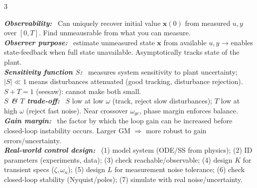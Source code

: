 \documentclass[9pt]{extarticle}
\newcommand{\sect}[1]{%
  \vspace{2pt}\par\noindent
  \colorbox{hdrbg}{\makebox[\dimexpr\linewidth-2\fboxsep][l]{%
    \textbf{\footnotesize\textcolor{hdr}{#1}}}}%
  \par\vspace{1.5pt}}
\newcommand{\sub}[1]{\textit{\textbf{#1:}}\ }
\begin{document}
\begin{multicols}{3}
\sect{21. Written Question Framework}
\sub{Observability} Can uniquely recover initial value $\mathbf x(0)$ from measured $u,y$ over $[0,T]$. Find unmeausrable from what you can measure.\\
\sub{Observer purpose} estimate unmeasured state $\mathbf x$ from available $u,y$ → enables state-feedback when full state unavailable. Asymptotically tracks state of the plant.\\
\sub{Sensitivity function $S$} measures system sensitivity to plant uncertainty; $|S|\ll1$ means disturbances attenuated (good tracking, disturbance rejection). $S{+}T=1$ (seesaw): cannot make both small.\\
\sub{$S$ \& $T$ trade-off} $S$ low at low $\omega$ (track, reject slow disturbances); $T$ low at high $\omega$ (reject fast noise). Near crossover $\omega_{gc}$, phase margin enforces balance.\\
\sub{Gain margin} the factor by which the loop gain can be increased before closed-loop instability occurs. Larger GM $\Rightarrow$ more robust to gain errors/uncertainty.\\
\sub{Real-world control design} (1) model system (ODE/SS from physics); (2) ID parameters (experiments, data); (3) check reachable/observable; (4) design $K$ for transient specs ($\zeta,\omega_n$); (5) design $L$ for measurement noise tolerance; (6) check closed-loop stability (Nyquist/poles); (7) simulate with real noise/uncertainty.\\

\end{multicols}
\end{document}
